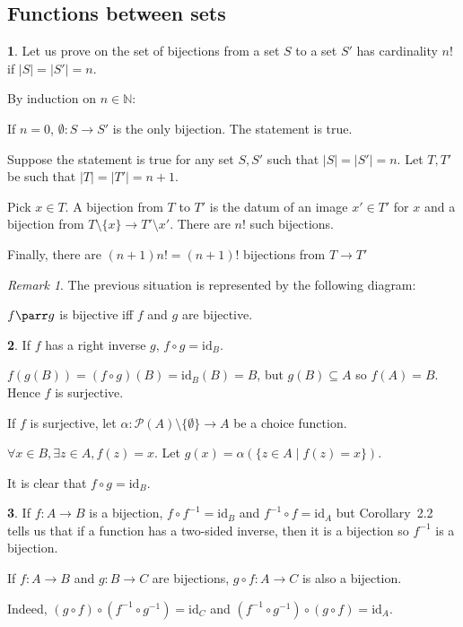 \documentclass[11pt]{article}
\theoremstyle{definition}
\newtheorem{exo}{}[subsection]
\theoremstyle{remark}
\newtheorem*{rmq}{Remark}
\def\subset{\subseteq}
\def\N{\mathbb{N}}
\def\id{\mathrm{id}}
\begin{document}
\subsection{Functions between sets}

\begin{exo}
	Let us prove on the set of bijections from a set $S$ to a set $S'$ has cardinality $n!$ if $|S|=|S'|=n$.
	
	By induction on $n\in\N$:

	If $n=0$, $\emptyset:S\to S'$ is the only bijection. The statement is true.

	Suppose the statement is true for any set $S,S'$ such that $|S|=|S'|=n$. Let $T,T'$ be such that $|T|=|T'|=n+1$.

	Pick $x\in T$. A bijection from $T$ to $T'$ is the datum of an image $x'\in T'$ for $x$ and a bijection from $T\setminus\{x\}\to T'\setminus{x'}$. There are $n!$ such bijections.

	Finally, there are $(n+1)n!=(n+1)!$ bijections from $T\to T'$
\end{exo}

\begin{rmq}
	The previous situation is represented by the following diagram:


	$f\parr g$ is bijective iff $f$ and $g$ are bijective.
\end{rmq}

\begin{exo}
	If $f$ has a right inverse $g$, $f\circ g=\id_B$.

	$f(g(B))=(f\circ g)(B)=\id_B(B)=B$, but $g(B)\subset A$ so $f(A)=B$. Hence $f$ is surjective.

	If $f$ is surjective, let $\alpha:\mathcal P(A)\setminus\{\emptyset\}\to A$ be a choice function.

	$\forall x\in B,\exists z\in A,f(z)=x$. Let $g(x)=\alpha(\{z\in A\mid f(z)=x\})$.

	It is clear that $f\circ g=\id_B$.
\end{exo}

\begin{exo}
	If $f:A\to B$ is a bijection, $f\circ f^{-1}=\id_B$ and $f^{-1}\circ f=\id_A$ but Corollary~2.2 tells us that if a function has a two-sided inverse, then it is a bijection so $f^{-1}$ is a bijection.

	If $f:A\to B$ and $g:B\to C$ are bijections, $g\circ f:A\to C$ is also a bijection.

	Indeed, $(g\circ f)\circ(f^{-1}\circ g^{-1})=\id_C$ and $(f^{-1}\circ g^{-1})\circ(g\circ f)=\id_A$.
\end{exo}
\end{document}
